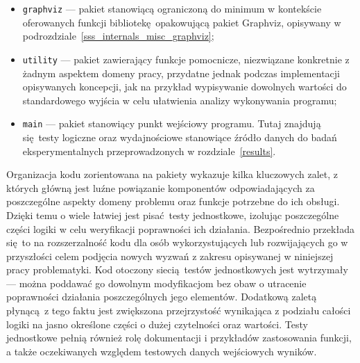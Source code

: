 {\begin{itemize}
    \item \texttt{graphviz} --- pakiet stanowiącą ograniczoną do minimum w kontekście oferowanych funkcji bibliotekę opakowującą pakiet Graphviz, opisywany w podrozdziale~\ref{sss_internals_misc_graphviz};
    \item \texttt{utility} --- pakiet zawierający funkcje pomocnicze, niezwiązane konkretnie z żadnym aspektem domeny pracy, przydatne jednak podczas implementacji opisywanych koncepcji, jak na przykład wypisywanie dowolnych wartości do standardowego wyjścia w celu ułatwienia analizy wykonywania programu;
    \item \texttt{main} --- pakiet stanowiący punkt wejściowy programu. Tutaj znajdują się testy logiczne oraz wydajnościowe stanowiące źródło danych do badań eksperymentalnych przeprowadzonych w rozdziale~\ref{results}.
  \end{itemize}
}
\par{
  Organizacja kodu zorientowana na pakiety wykazuje kilka kluczowych zalet, z których główną jest luźne powiązanie komponentów odpowiadających za poszczególne aspekty domeny problemu oraz funkcje potrzebne do ich obsługi.
  Dzięki temu o wiele łatwiej jest pisać testy jednostkowe, izolując poszczególne części logiki w celu weryfikacji poprawności ich działania. 
  Bezpośrednio przekłada się to na rozszerzalność kodu dla osób wykorzystujących lub rozwijających go w przyszłości celem podjęcia nowych wyzwań z zakresu opisywanej w niniejszej pracy problematyki.
  Kod otoczony siecią testów jednostkowych jest wytrzymały --- można poddawać go dowolnym modyfikacjom bez obaw o utracenie poprawności działania poszczególnych jego elementów.
  Dodatkową zaletą płynącą z tego faktu jest zwiększona przejrzystość wynikająca z podziału całości logiki na jasno określone części o dużej czytelności oraz wartości.
  Testy jednostkowe pełnią również rolę dokumentacji i przykładów zastosowania funkcji, a także oczekiwanych względem testowych danych wejściowych wyników.
}